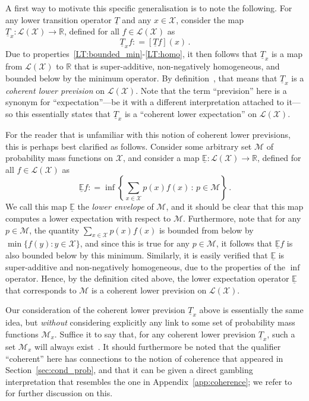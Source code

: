 \documentclass[10pt,a4paper]{paper}
\theoremstyle{definition}
\newcommand{\reals}{\mathbb{R}}
\newcommand{\states}{\mathcal{X}}
\newcommand{\lt}{\underline{T}}
\newcommand{\gambles}{\mathcal{L}}
\newcommand{\gamblesX}{\gambles(\states)}
\newcommand{\coloneqq}{:\!=}
\begin{document}
A first way to motivate this specific generalisation is to note the following. For any lower transition operator $\lt$ and any $x\in\states$, consider the map $\lt_x:\gamblesX\to\reals$, defined for all $f\in\gamblesX$ as
\begin{equation}\label{eq:lowerprevisionfromlt}
\lt_xf \coloneqq \left[\lt f\right](x)\,.
\end{equation}
Due to properties~\ref{LT:bounded_min}-\ref{LT:homo}, it then follows that $\lt_x$ is a map from $\gamblesX$ to $\reals$ that is super-additive, non-negatively homogeneous, and bounded below by the minimum operator. By definition~\cite[Definition~2.3.3]{Walley:1991vk}, that means that $\lt_x$ is a \emph{coherent lower prevision} on $\gamblesX$. Note that the term ``prevision'' here is a synonym for ``expectation''---be it with a different interpretation attached to it---so this essentially states that $\lt_x$ is a ``coherent lower expectation'' on $\gamblesX$.

For the reader that is unfamiliar with this notion of coherent lower previsions, this is perhaps best clarified as follows. Consider some arbitrary set $\mathcal{M}$ of probability mass functions on $\states$, and consider a map $\underline{\mathbb{E}}:\gamblesX\to\reals$, defined for all $f\in\gamblesX$ as
\begin{equation*}
\underline{\mathbb{E}}f \coloneqq \inf\left\{\sum_{x\in\states} p(x)f(x)\,:\,p\in\mathcal{M}\right\}\,.
\end{equation*}
We call this map $\underline{\mathbb{E}}$ the \emph{lower envelope} of $\mathcal{M}$, and it should be clear that this map computes a lower expectation with respect to $\mathcal{M}$. Furthermore, note that for any $p\in\mathcal{M}$, the quantity $\sum_{x\in\states}p(x)f(x)$ is bounded from below by $\min\{f(y):y\in\states\}$, and since this is true for any $p\in\mathcal{M}$, it follows that $\underline{\mathbb{E}}f$ is also bounded below by this minimum. Similarly, it is easily verified that $\underline{\mathbb{E}}$ is super-additive and non-negatively homogeneous, due to the properties of the $\inf$ operator. Hence, by the definition cited above, the lower expectation operator $\underline{\mathbb{E}}$ that corresponds to $\mathcal{M}$ is a coherent lower prevision on $\gamblesX$. 

Our consideration of the coherent lower prevision $\lt_x$  above is essentially the same idea, but \emph{without} considering explicitly any link to some set of probability mass functions $\mathcal{M}_x$. Suffice it to say that, for any coherent lower prevision $\lt_x$, such a set $\mathcal{M}_x$ will always exist~\cite[Section 10.2]{Huber:1981ch}. It should furthermore be noted that the qualifier ``coherent'' here has connections to the notion of coherence that appeared in Section~\ref{sec:cond_prob}, 
and that it can be given a direct gambling interpretation that resembles the one in Appendix~\ref{app:coherence}; we refer to~\cite{troffaes2013:lp,Walley:1991vk} for further discussion on this.
\end{document}

